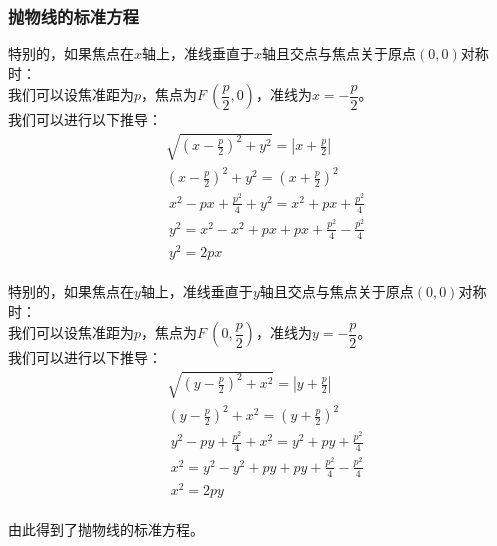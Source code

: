 \documentclass[UTF8]{ctexart}
\begin{document}
\subsubsection{抛物线的标准方程}
    特别的，如果焦点在$x$轴上，准线垂直于$x$轴且交点与焦点关于原点$(0,0)$对称时：\\[2mm]
    我们可以设焦准距为$p$，焦点为$F~(\dfrac{p}{2},0)$，准线为$x=-\dfrac{p}{2}$。\\[4mm]
    我们可以进行以下推导：
    \setcounter{equation}{0}
    \begin{align}
        &\sqrt{\left(x-\frac{p}{2}\right)^2+y^2}=\left|x+\frac{p}{2}\right|\\[5mm]
        &\left(x-\frac{p}{2}\right)^2+y^2=\left(x+\frac{p}{2}\right)^2\\[5mm]
        &~x^2-px+\frac{p^2}{4}+y^2=x^2+px+\frac{p^2}{4}\\[5mm]
        &~y^2=x^2-x^2+px+px+\frac{p^2}{4}-\frac{p^2}{4}\\[5mm]
        &~y^2=2px
    \end{align}\\
    特别的，如果焦点在$y$轴上，准线垂直于$y$轴且交点与焦点关于原点$(0,0)$对称时：\\[2mm]
    我们可以设焦准距为$p$，焦点为$F~(0,\dfrac{p}{2})$，准线为$y=-\dfrac{p}{2}$。\\[4mm]
    我们可以进行以下推导：
    \setcounter{equation}{0}
    \begin{align}
        &\sqrt{\left(y-\frac{p}{2}\right)^2+x^2}=\left|y+\frac{p}{2}\right|\\[5mm]
        &\left(y-\frac{p}{2}\right)^2+x^2=\left(y+\frac{p}{2}\right)^2\\[5mm]
        &~y^2-py+\frac{p^2}{4}+x^2=y^2+py+\frac{p^2}{4}\\[5mm]
        &~x^2=y^2-y^2+py+py+\frac{p^2}{4}-\frac{p^2}{4}\\[5mm]
        &~x^2=2py
    \end{align}\\
    由此得到了抛物线的标准方程。

\newpage
\end{document}

